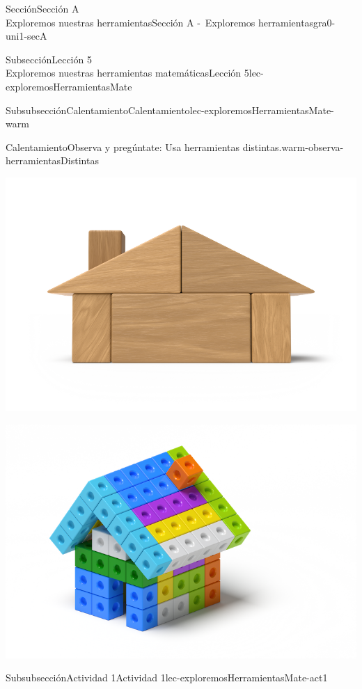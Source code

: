 \begin{sectionptx}{Sección}{{\Large Sección A\\}Exploremos nuestras herramientas}{}{Sección A -~Exploremos herramientas}{}{}{gra0-uni1-secA}
\begin{subsectionptx}{Subsección}{{\normalsize Lección 5\\[-0.05cm]}Exploremos nuestras herramientas matemáticas}{}{Lección 5}{}{}{lec-exploremosHerramientasMate}
\begin{subsubsectionptx}{Subsubsección}{Calentamiento}{}{Calentamiento}{}{}{lec-exploremosHerramientasMate-warm}
\begin{exploration}{Calentamiento}{Observa y pregúntate: Usa herramientas distintas.}{warm-observa-herramientasDistintas}
\begin{sidebyside}{2}{0.05}{0.05}{0.1}
\begin{sbspanel}{0.4}
\includegraphics[max width=\linewidth, center]{external/png-source/K.1.A Beta Student Workbook.Woodhouse_withShadow.png}
\par
\includegraphics[max width=\linewidth, center]{external/png-source/5.1.A2.House_withShadow.png}
\end{sbspanel}%
\end{sidebyside}%
\end{exploration}%
\end{subsubsectionptx}
%
%
\typeout{************************************************}
\typeout{************************************************}
%
\begin{subsubsectionptx}{Subsubsección}{Actividad 1}{}{Actividad 1}{}{}{lec-exploremosHerramientasMate-act1}

\end{subsubsectionptx}
\end{subsectionptx}
\end{sectionptx}
